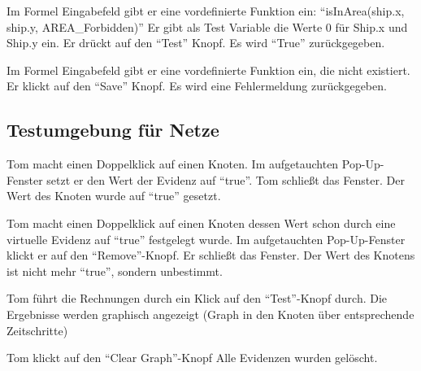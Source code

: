 \documentclass[parskip=full,11pt,twoside]{scrartcl}
\begin{document}
{Im Formel Eingabefeld gibt er eine vordefinierte Funktion ein: \enquote{isInArea(ship.x, ship.y, AREA\_Forbidden)}
Er gibt als Test Variable die Werte 0 für Ship.x und Ship.y ein. Er drückt auf den \enquote{Test} Knopf.}
{Es wird \enquote{True} zurückgegeben.}

{Im Formel Eingabefeld gibt er eine vordefinierte Funktion ein, die nicht existiert. Er klickt auf den \enquote{Save} Knopf.}
{Es wird eine Fehlermeldung zurückgegeben.}

\subsection{Testumgebung für Netze}


{Tom macht einen Doppelklick auf einen Knoten. Im aufgetauchten Pop-Up-Fenster setzt er den Wert der Evidenz auf \enquote{true}. Tom schließt das Fenster.}
{Der Wert des Knoten wurde auf \enquote{true} gesetzt.}

{Tom macht einen Doppelklick auf einen Knoten dessen Wert schon durch eine virtuelle Evidenz auf \enquote{true} festgelegt wurde.
Im aufgetauchten Pop-Up-Fenster klickt er auf den \enquote{Remove}-Knopf. Er schließt das Fenster.}
{Der Wert des Knotens ist nicht mehr \enquote{true}, sondern unbestimmt.} 

{Tom führt die Rechnungen durch ein Klick auf den \enquote{Test}-Knopf durch.} %
{Die Ergebnisse werden graphisch angezeigt (Graph in den Knoten über entsprechende Zeitschritte)}

{Tom klickt auf den \enquote{Clear Graph}-Knopf}
{Alle Evidenzen wurden gelöscht.}
\end{document}
